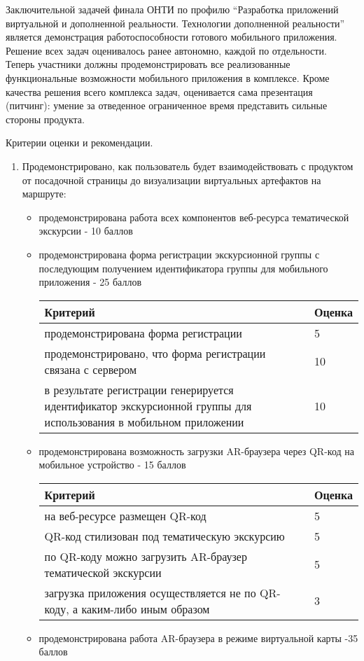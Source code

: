 
Заключительной задачей финала ОНТИ по профилю “Разработка приложений виртуальной и дополненной реальности. Технологии дополненной реальности” является демонстрация работоспособности готового мобильного приложения. Решение всех задач оценивалось ранее автономно, каждой по отдельности. Теперь участники должны продемонстрировать все реализованные функциональные возможности мобильного приложения в комплексе. Кроме качества решения всего комплекса задач, оценивается сама презентация (питчинг): умение за отведенное ограниченное время представить  сильные стороны продукта. 

Критерии оценки и рекомендации.
\begin{enumerate}
    \item Продемонстрировано, как пользователь будет взаимодействовать с продуктом от посадочной страницы до визуализации виртуальных артефактов  на маршруте:
    \begin{itemize}
        \item продемонстрирована работа всех компонентов веб-ресурса тематической экскурсии - 10 баллов
        \item продемонстрирована форма регистрации экскурсионной группы с последующим получением идентификатора группы для мобильного приложения  - 25 баллов
        
        \begin{tabular}{|p{7cm}|l|}
            \hline
            Критерий & Оценка \\
            \hline
            продемонстрирована форма регистрации & 5 \\
            \hline
            продемонстрировано, что форма регистрации связана с сервером & 10 \\
            \hline
            в результате регистрации генерируется идентификатор экскурсионной группы для использования в мобильном приложении & 10 \\
            \hline
        \end{tabular}
        \item продемонстрирована возможность загрузки AR-браузера через QR-код на мобильное устройство - 15 баллов
        
        \begin{tabular}{|p{7cm}|l|}
            \hline
            Критерий & Оценка \\
            \hline
            на веб-ресурсе размещен QR-код & 5 \\
            \hline
            QR-код стилизован под тематическую экскурсию & 5 \\
            \hline
            по QR-коду можно загрузить AR-браузер тематической экскурсии & 5 \\
            \hline
            загрузка приложения осуществляется не по QR-коду, а каким-либо иным образом & 3 \\
            \hline
        \end{tabular}
        \item продемонстрирована работа AR-браузера в режиме виртуальной карты -35 баллов
        

\end{itemize}
\end{enumerate}
